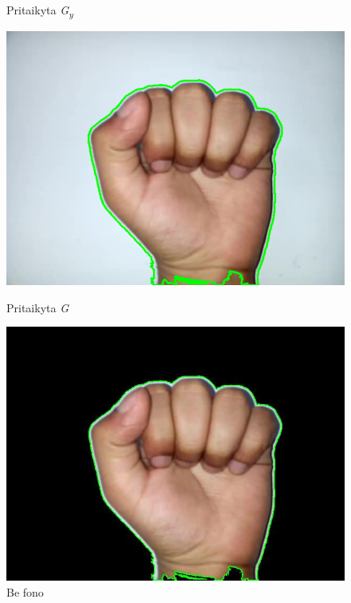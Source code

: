 \documentclass{VUMIFInfKursinis}
\begin{document}
\begin{figure}[H]
\begin{minipage}{.3\textwidth}
		\caption{Pritaikyta \textit{G\textsubscript{y}}}
		\label{img:a-sobelY}
	\end{minipage}\hspace{\fill}%
	\begin{minipage}{.3\textwidth}
		\centering
		\includegraphics[width=.8\linewidth]{img/A-sobel}
		\caption{Pritaikyta \textit{G}}
		\label{img:a-sobel}
	\end{minipage}\hspace{\fill}%
		\begin{minipage}{.3\textwidth}
			\centering
			\includegraphics[width=.8\linewidth]{img/A-black}
			\caption{Be fono}
			\label{img:a-black-sign}
		\end{minipage}\hspace{\fill}%

\end{figure}
\end{document}
